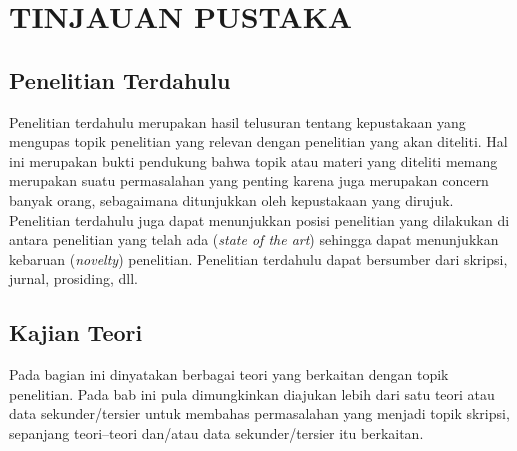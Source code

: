 \chapter{TINJAUAN PUSTAKA}

\section{Penelitian Terdahulu}
Penelitian terdahulu merupakan hasil telusuran tentang kepustakaan yang mengupas topik penelitian yang relevan dengan penelitian yang akan diteliti. Hal ini merupakan bukti pendukung bahwa topik atau materi yang diteliti memang merupakan suatu permasalahan yang penting karena juga merupakan concern banyak orang, sebagaimana ditunjukkan oleh kepustakaan yang dirujuk. Penelitian terdahulu juga dapat menunjukkan posisi penelitian yang dilakukan di antara penelitian yang telah ada (\textit{state of the art}) sehingga dapat menunjukkan kebaruan (\textit{novelty}) penelitian. Penelitian terdahulu dapat bersumber dari skripsi, jurnal, prosiding, dll.

\section{Kajian Teori}
Pada bagian ini dinyatakan berbagai teori yang berkaitan dengan topik penelitian. Pada bab ini pula dimungkinkan diajukan lebih dari satu teori atau data sekunder/tersier untuk membahas permasalahan yang menjadi topik skripsi, sepanjang teori–teori dan/atau data sekunder/tersier itu berkaitan.

